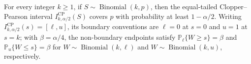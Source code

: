 For every integer \(k\geq1\), if \(S\sim\operatorname{Binomial}(k,p)\), then the equal-tailed Clopper--Pearson interval \(I^{\mathrm{CP}}_{k,\alpha/2}(S)\) covers \(p\) with probability at least \(1-\alpha/2\).  Writing \(I^{\mathrm{CP}}_{k,\alpha/2}(s)=[\ell,u]\), its boundary conventions are \(\ell=0\) at \(s=0\) and \(u=1\) at \(s=k\); with \(\beta=\alpha/4\), the non-boundary endpoints satisfy \(\mathbb P_{\ell}\{W\geq s\}=\beta\) and \(\mathbb P_u\{W\leq s\}=\beta\) for \(W\sim\operatorname{Binomial}(k,\ell)\) and \(W\sim\operatorname{Binomial}(k,u)\), respectively.